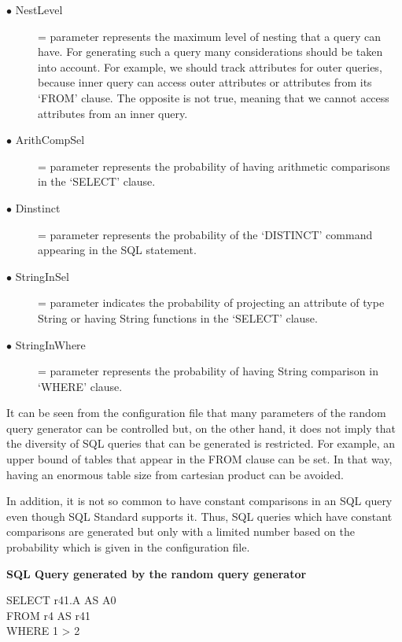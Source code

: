 \begin{description}
\item[$\bullet$ NestLevel]= parameter represents the maximum level of nesting that a query can have. For generating such a query many considerations should be taken into account. For example, we should track attributes for outer queries, because inner query can access outer attributes or attributes from its ‘FROM’ clause. The opposite is not true, meaning that we cannot access attributes from an inner query. 

\item[$\bullet$ ArithCompSel] = parameter represents the probability of having arithmetic comparisons in the ‘SELECT’ clause. 

\item[$\bullet$ Dinstinct ] = parameter represents the probability of the ‘DISTINCT’ command appearing in the SQL statement. 

\item[$\bullet$ StringInSel] = parameter indicates the probability of projecting an attribute of type String or having String functions in the ‘SELECT’ clause. 

\item[$\bullet$ StringInWhere] = parameter represents the probability of having String comparison in ‘WHERE’ clause. 
 
\end{description} 

It can be seen from the configuration file that many parameters of the random query generator can be controlled but, on the other hand, it does not imply that the diversity of SQL queries that can be generated is restricted. For example, an upper bound of tables that appear in the FROM clause can be set. In that way, having an enormous table size from cartesian product can be avoided.

In addition, it is not so common to have constant comparisons in an SQL query even though SQL Standard supports it. Thus, SQL queries which have constant comparisons are generated but only with a limited number based on the probability which is given in the configuration file.


\textbf{SQL Query generated by the random query generator} 

\begin{mdframed}[backgroundcolor=gray!20] 
SELECT r41.A AS A0
\\FROM r4 AS r41
\\WHERE 1 > 2
\end{mdframed}

